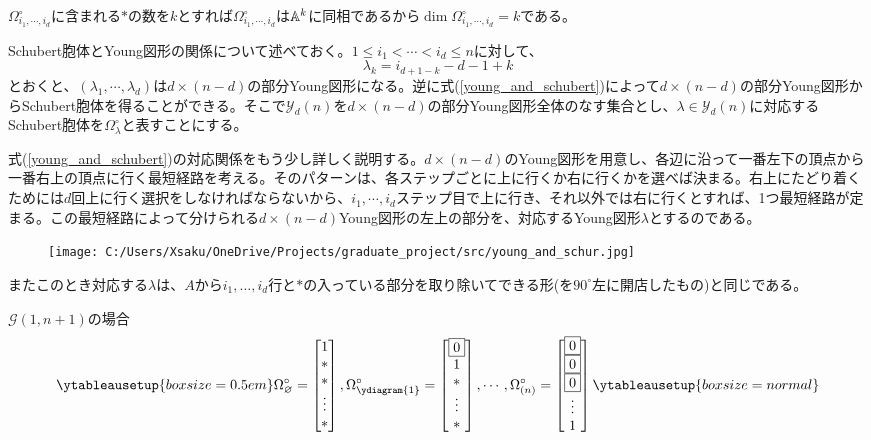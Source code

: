 \documentclass{ltjsreport}
\begin{document}
$\Omega^\circ_{i_1,\cdots,i_d}$に含まれる$*$の数を$k$とすれば$\Omega^\circ_{i_1,\cdots,i_d}$は$\mathbb{A}^k$に同相であるから$\dim\Omega^\circ_{i_1,\cdots,i_d}=k$である。

Schubert胞体とYoung図形の関係について述べておく。$1\leq i_1<\cdots<i_d\leq n$に対して、
\begin{equation}\label{young_and_schubert}
\lambda_{k}=i_{d+1-k}-d-1+k  
\end{equation}
とおくと、$(\lambda_1,\cdots,\lambda_d)$は$d\times (n-d)$の部分Young図形になる。逆に式(\ref{young_and_schubert})によって$d\times (n-d)$の部分Young図形からSchubert胞体を得ることができる。そこで$\mathcal{Y}_d(n)$を$d\times (n-d)$の部分Young図形全体のなす集合とし、$\lambda\in\mathcal{Y}_d(n)$に対応するSchubert胞体を$\Omega^\circ_{\lambda}$と表すことにする。

式(\ref{young_and_schubert})の対応関係をもう少し詳しく説明する。$d\times (n-d)$のYoung図形を用意し、各辺に沿って一番左下の頂点から一番右上の頂点に行く最短経路を考える。そのパターンは、各ステップごとに上に行くか右に行くかを選べば決まる。右上にたどり着くためには$d$回上に行く選択をしなければならないから、$i_1,\cdots,i_d$ステップ目で上に行き、それ以外では右に行くとすれば、1つ最短経路が定まる。この最短経路によって分けられる$d\times(n-d)$Young図形の左上の部分を、対応するYoung図形$\lambda$とするのである。
\begin{figure}[H]
  \centering
  \texttt{[image: C:/Users/Xsaku/OneDrive/Projects/graduate\_project/src/young\_and\_schur.jpg]}
\end{figure}
またこのとき対応する$\lambda$は、$A$から$i_1,\dots,i_d$行と$*$の入っている部分を取り除いてできる形(を$90^\circ$左に開店したもの)と同じである。


\begin{eg}
  $\mathcal{G}(1,n+1)$の場合
  \[
  \ytableausetup{boxsize=0.5em}
  \Omega_{\varnothing}^\circ=\bmat{1\\ * \\ * \\\vdots\\ *},
  \Omega_{\ydiagram{1}}^\circ=\bmat{\fbox{0}\\1\\ * \\\vdots\\ *},
  \cdots,
  \Omega_{(n)}^\circ=\bmat{\fbox{0}\\\fbox{0}\\\fbox{0}\\\vdots\\1}
  \ytableausetup{boxsize=normal}
  \]
\end{eg}
\end{document}
